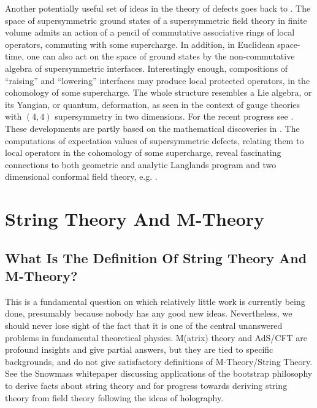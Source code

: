 \documentclass[12pt]{article}
\begin{document}
Another potentially useful set of ideas in the theory of defects 
goes back to \cite{NikRome:2009, Nekrasov:2009uh}.  
The space of supersymmetric ground states of a 
supersymmetric field theory in finite volume admits an action of a pencil of commutative associative rings of local operators, commuting with some supercharge. In addition, in Euclidean space-time, one can also act on the space of ground states by the non-commutative algebra of supersymmetric interfaces. Interestingly enough, compositions of ``raising'' and ``lowering'' interfaces may produce local protected operators, in the cohomology of some supercharge. The whole structure resembles a Lie algebra, or its Yangian, or quantum, deformation, as seen in the context of gauge theories with $(4,4)$ supersymmetry in two dimensions. 
For the recent progress see \cite{Dedushenko:2021mds}. These developments
are partly based on the mathematical discoveries in \cite{nakajima1999quiver,maulik2018quantum}. 
The computations \cite{nekrasovbpscft4} of expectation values of supersymmetric defects, relating them to local operators in the cohomology of some supercharge, reveal fascinating connections to both geometric \cite{Frenkel:2004LP} and analytic Langlands program \cite{Etingof:2019pni,Etingof:2021eub, Etingof:2021eeu} and two dimensional conformal field theory, e.g. \cite{Nekrasov:2021tik}. 






\section{String Theory And M-Theory}
\label{sec:STMT}

\subsection{What Is The Definition Of String Theory And  M-Theory?}

\bigskip
\bigskip
\begin{center}  \end{center}
\bigskip
\bigskip

This is a fundamental question on which relatively little work is currently 
being done, presumably because nobody has any good new ideas. 
Nevertheless, we should
never lose sight of the fact that it is one of the central unanswered problems in fundamental theoretical physics.
M(atrix) theory \cite{Banks:1996vh,Banks:1997mn,Banks:1999az,Bigatti:1997jy} and AdS/CFT \cite{Aharony:1999ti}
are profound insights and give partial answers, 
but they are tied to specific backgrounds,
and do not give satisfactory definitions of M-Theory/String Theory. 
 See the Snowmass whitepaper \cite{Gopakumar:2022kof} discussing applications of the bootstrap philosophy to derive facts about string theory and \cite{Gopakumar:2003ns,Das:2003vw,Gopakumar:2005fx,Razamat:2008zr,Eberhardt:2019ywk,Aharony:2020omh} for progress towards deriving string theory from field theory following the ideas of holography. 
\end{document}
